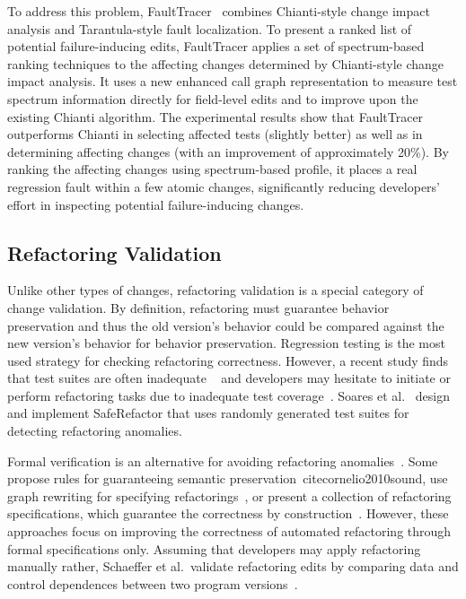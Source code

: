 To address this problem, FaultTracer~\cite{zhang2011localizing} combines Chianti-style change impact analysis and Tarantula-style fault localization. To present a ranked list of potential failure-inducing edits, FaultTracer applies a set of spectrum-based ranking techniques to the affecting changes determined by Chianti-style change impact analysis. It uses a new enhanced call graph representation to measure test spectrum information directly for field-level edits and to improve upon the existing Chianti algorithm. The experimental results show that FaultTracer outperforms Chianti in selecting affected tests (slightly better) as well as in determining affecting changes (with an improvement of approximately 20\%). By ranking the affecting changes using spectrum-based profile, it places a real regression fault within a few atomic changes, significantly reducing developers’ effort in inspecting potential failure-inducing changes.

\subsection{Refactoring Validation} 
\label{sec:refactoringvalidation} 

Unlike other types of changes, refactoring validation is a special category of change validation. By definition, refactoring must guarantee behavior preservation and thus the old version's behavior could be compared against the new version's behavior for behavior preservation. Regression testing is the most used strategy for checking refactoring correctness. However, a recent study finds that test suites are often inadequate ~\cite{Rachatasumrit2012:refactortest} and developers may hesitate to initiate or perform refactoring tasks due to inadequate test coverage~\cite{Kim2012:FSR}. Soares et al.~\cite{Soares:icse10} design and implement SafeRefactor that uses randomly generated test suites for detecting refactoring anomalies. 

Formal verification is an alternative for avoiding refactoring anomalies~\cite{Mens2004:SSR}. Some propose rules for guaranteeing semantic preservation~cite{cornelio2010sound}, use graph rewriting for specifying refactorings~\cite{mens2005formalizing}, or present a collection of refactoring specifications, which guarantee the correctness by construction~\cite{overbey2010collection}. However, these approaches focus on improving the correctness of automated refactoring through formal specifications only. Assuming that developers may apply refactoring manually rather, Schaeffer et al.~validate refactoring edits by comparing data and control dependences between two program versions~\cite{Schaefer2010:refactoring}. 

